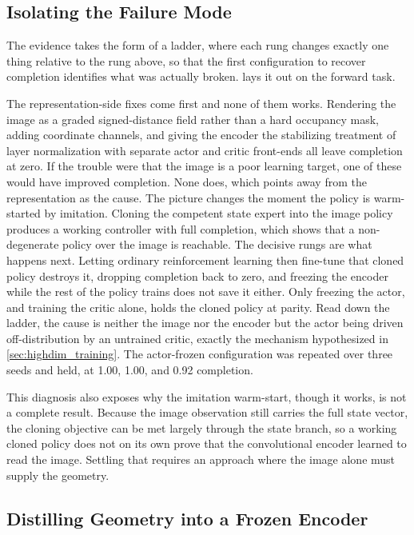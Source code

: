 \subsection{Isolating the Failure Mode}
\label{sec:causal_ladder}

The evidence takes the form of a ladder, where each rung changes exactly one thing relative to the rung above, so that the first configuration to recover completion identifies what was actually broken.  lays it out on the forward task.



The representation-side fixes come first and none of them works. Rendering the image as a graded signed-distance field rather than a hard occupancy mask, adding coordinate channels, and giving the encoder the stabilizing treatment of layer normalization with separate actor and critic front-ends all leave completion at zero. If the trouble were that the image is a poor learning target, one of these would have improved completion. None does, which points away from the representation as the cause. The picture changes the moment the policy is warm-started by imitation. Cloning the competent state expert into the image policy produces a working controller with full completion, which shows that a non-degenerate policy over the image is reachable. The decisive rungs are what happens next. Letting ordinary reinforcement learning then fine-tune that cloned policy destroys it, dropping completion back to zero, and freezing the encoder while the rest of the policy trains does not save it either. Only freezing the actor, and training the critic alone, holds the cloned policy at parity. Read down the ladder, the cause is neither the image nor the encoder but the actor being driven off-distribution by an untrained critic, exactly the mechanism hypothesized in \cref{sec:highdim_training}. The actor-frozen configuration was repeated over three seeds and held, at 1.00, 1.00, and 0.92 completion.

This diagnosis also exposes why the imitation warm-start, though it works, is not a complete result. Because the image observation still carries the full state vector, the cloning objective can be met largely through the state branch, so a working cloned policy does not on its own prove that the convolutional encoder learned to read the image. Settling that requires an approach where the image alone must supply the geometry.

\subsection{Distilling Geometry into a Frozen Encoder}
\label{sec:geometry_encoder}

